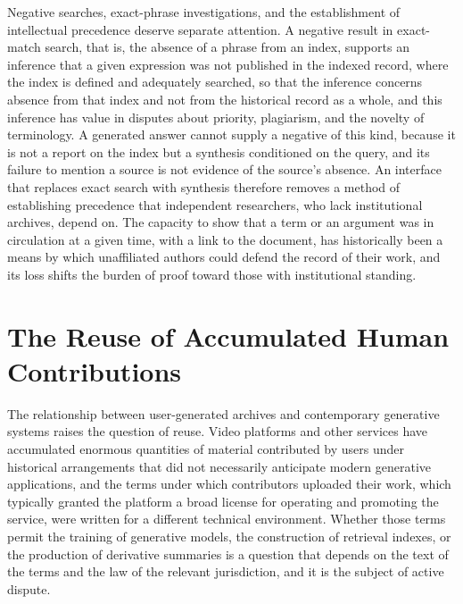 \documentclass[11pt]{article}
\theoremstyle{remark}
\begin{document}
Negative searches, exact-phrase investigations, and the establishment of intellectual precedence deserve separate attention. A negative result in exact-match search, that is, the absence of a phrase from an index, supports an inference that a given expression was not published in the indexed record, where the index is defined and adequately searched, so that the inference concerns absence from that index and not from the historical record as a whole, and this inference has value in disputes about priority, plagiarism, and the novelty of terminology. A generated answer cannot supply a negative of this kind, because it is not a report on the index but a synthesis conditioned on the query, and its failure to mention a source is not evidence of the source's absence. An interface that replaces exact search with synthesis therefore removes a method of establishing precedence that independent researchers, who lack institutional archives, depend on. The capacity to show that a term or an argument was in circulation at a given time, with a link to the document, has historically been a means by which unaffiliated authors could defend the record of their work, and its loss shifts the burden of proof toward those with institutional standing.

\section{The Reuse of Accumulated Human Contributions}\label{sec:reuse}

The relationship between user-generated archives and contemporary generative systems raises the question of reuse. Video platforms and other services have accumulated enormous quantities of material contributed by users under historical arrangements that did not necessarily anticipate modern generative applications, and the terms under which contributors uploaded their work, which typically granted the platform a broad license for operating and promoting the service, were written for a different technical environment. Whether those terms permit the training of generative models, the construction of retrieval indexes, or the production of derivative summaries is a question that depends on the text of the terms and the law of the relevant jurisdiction, and it is the subject of active dispute.
\end{document}
